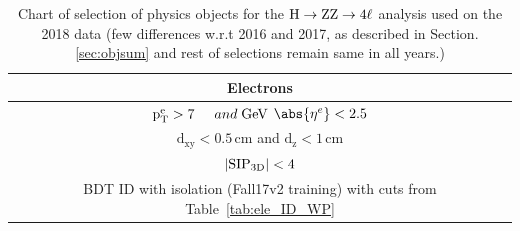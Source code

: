 \begin{itemize}
\renewcommand{\arraystretch}{2}
\begin{table}[H]
	\scriptsize
	\centering
	\caption{Chart of selection of physics objects for the $\mathrm{H}\rightarrow\mathrm{ZZ}\rightarrow4\ell$ analysis used on the 2018 data (few differences w.r.t 2016 and 2017, as described in Section. \ref{sec:objsum} and rest of selections remain same in all years.)} 
	\label{tab:objsummary}
	\begin{tabular}{|c|c|}
		\hline \hline
		\multicolumn{2}{|c|}{\textbf{Electrons}}                                                                                                                                                                                    \\ \hline
		\multicolumn{2}{|c|}{$\mathrm{p_T^e} > 7 \hspace{0.5cm} and  \hbox{$\;\hbox{\rm GeV}$}$ \hspace{0.5cm} $\abs{\eta^e} < 2.5$}                                                                                                                                               \\
		\multicolumn{2}{|c|}{$\mathrm{d_{xy}} < 0.5 \, \mathrm{cm}$ \hspace{0.5cm}  and \hspace{0.5cm} $\mathrm{d_{z}} < 1 \, \mathrm{cm}$}                                                                                                                           \\
		\multicolumn{2}{|c|}{$| {\rm SIP_{3D}} | < 4$ }                                                                                                                                                                                   \\
                \multicolumn{2}{|c|}{BDT ID with isolation (Fall17v2 training) with cuts from Table~\ref{tab:ele_ID_WP} }    \\        

\end{tabular}
\end{table}
\end{itemize}
